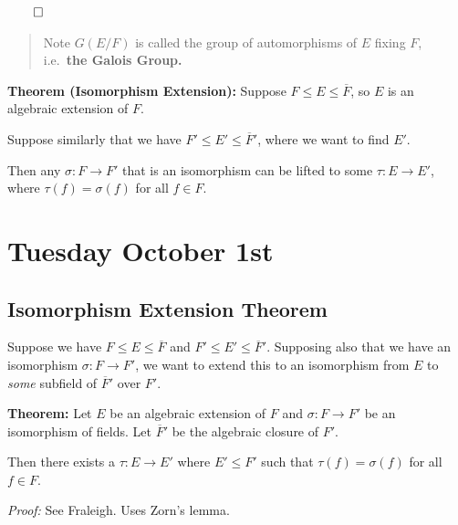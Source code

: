 \(\qed\)

\begin{quote}
Note \(G(E/F)\) is called the group of automorphisms of \(E\) fixing
\(F\), i.e.~\textbf{the Galois Group.}
\end{quote}

\textbf{Theorem (Isomorphism Extension):} Suppose
\(F \leq E \leq \overline F\), so \(E\) is an algebraic extension of
\(F\).

Suppose similarly that we have \(F' \leq E' \leq \overline F'\), where
we want to find \(E'\).

Then any \(\sigma: F \to F'\) that is an isomorphism can be lifted to
some \(\tau: E \to E'\), where \(\tau(f) = \sigma(f)\) for all
\(f\in F\).

\begin{center}
\end{center}

\hypertarget{tuesday-october-1st}{%
\section{Tuesday October 1st}\label{tuesday-october-1st}}

\hypertarget{isomorphism-extension-theorem}{%
\subsection{Isomorphism Extension
Theorem}\label{isomorphism-extension-theorem}}

Suppose we have \(F\leq E \leq \overline F\) and
\(F' \leq E' \leq \overline{F}'\). Supposing also that we have an
isomorphism \(\sigma: F \to F'\), we want to extend this to an
isomorphism from \(E\) to \emph{some} subfield of \(\overline{F}'\) over
\(F'\).

\textbf{Theorem:} Let \(E\) be an algebraic extension of \(F\) and
\(\sigma: F \to F'\) be an isomorphism of fields. Let \(\overline{F}'\)
be the algebraic closure of \(F'\).

Then there exists a \(\tau: E \to E'\) where \(E' \leq F'\) such that
\(\tau(f) = \sigma(f)\) for all \(f \in F\).

\emph{Proof:} See Fraleigh. Uses Zorn's lemma.

